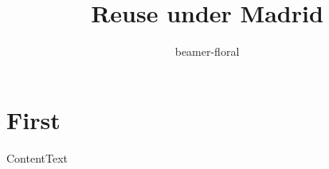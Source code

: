 \documentclass[aspectratio=169]{beamer}
\title{Reuse under Madrid}\author{beamer-floral}\date{}
\begin{document}
\begin{frame}\titlepage\end{frame}
\section{First}
\begin{frame}{Content}Text\end{frame}
\end{document}
